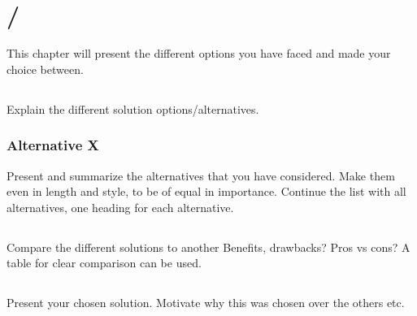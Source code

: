 \section{/
         }\label{sec:choiceofsolution} 
       
This chapter will present the different options you have faced and made your
choice between.

\subsection{}\label{subsec:solutionalt}
Explain the different solution options/alternatives.

\subsubsection{Alternative X}\label{subsubsec:altx}
Present and summarize the alternatives that you have considered. Make them even
in length and style, to be of equal in importance. Continue the list with all
alternatives, one heading for each alternative.

\subsection{}\label{subsec:comparesolution}
Compare the different solutions to another Benefits, drawbacks? Pros vs cons? A
table for clear comparison can be used.

\subsection{}\label{subsec:chosensolution}
Present your chosen solution. Motivate why this was chosen over the others etc.\
